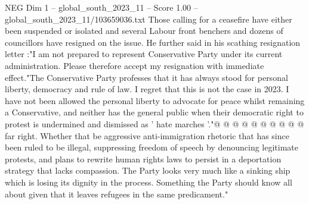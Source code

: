 \begin{textsample}{NEG Dim 1 – global\_south\_2023\_11 – Score 1.00 – global\_south\_2023\_11/103659036.txt}
Those calling for a ceasefire have either been suspended or isolated and several Labour front benchers and dozens of councillors have resigned on the issue.
He further said in his scathing resignation letter :"I am not prepared to represent Conservative Party under its current administration.
Please therefore accept my resignation with immediate effect."The Conservative Party professes that it has always stood for personal liberty, democracy and rule of law.
I regret that this is not the case in 2023.
I have not been allowed the personal liberty to advocate for peace whilst remaining a Conservative, and neither has the general public when their democratic right to protest is undermined and dismissed as ' hate marches '."@ @ @ @ @ @ @ @ @ @ far right.
Whether that be aggressive anti-immigration rhetoric that has since been ruled to be illegal, suppressing freedom of speech by denouncing legitimate protests, and plans to rewrite human rights laws to persist in a deportation strategy that lacks compassion.
The Party looks very much like a sinking ship which is losing its dignity in the process.
Something the Party should know all about given that it leaves refugees in the same predicament."

\end{textsample}
